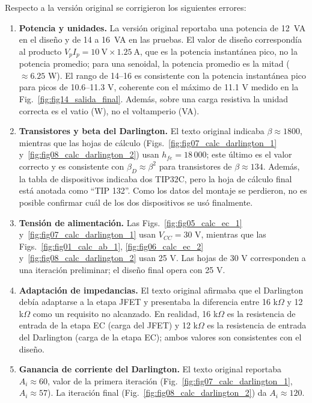 \documentclass[10pt,twocolumn,letterpaper]{article}
\begin{document}
Respecto a la versión original se corrigieron los siguientes errores:
\begin{enumerate}[leftmargin=1.4em]
\item \textbf{Potencia y unidades.} La versión original reportaba una potencia de 12~VA en el diseño y de 14 a 16~VA en las pruebas. El valor de diseño correspondía al producto \(V_p I_p = 10\ \text{V} \times 1.25\ \text{A}\), que es la potencia instantánea pico, no la potencia promedio; para una senoidal, la potencia promedio es la mitad (\(\approx 6.25\) W). El rango de 14--16 es consistente con la potencia instantánea pico para picos de 10.6--11.3 V, coherente con el máximo de 11.1 V medido en la Fig.~\ref{fig:fig14_salida_final}. Además, sobre una carga resistiva la unidad correcta es el vatio (W), no el voltamperio (VA).
\item \textbf{Transistores y beta del Darlington.} El texto original indicaba \(\beta \approx 1800\), mientras que las hojas de cálculo (Figs.~\ref{fig:fig07_calc_darlington_1} y~\ref{fig:fig08_calc_darlington_2}) usan \(h_{fe} = 18\,000\); este último es el valor correcto y es consistente con \(\beta_D \approx \beta^2\) para transistores de \(\beta \approx 134\). Además, la tabla de dispositivos indicaba dos TIP32C, pero la hoja de cálculo final está anotada como ``TIP 132''. Como los datos del montaje se perdieron, no es posible confirmar cuál de los dos dispositivos se usó finalmente.
\item \textbf{Tensión de alimentación.} Las Figs.~\ref{fig:fig05_calc_ec_1} y~\ref{fig:fig07_calc_darlington_1} usan \(V_{CC} = 30\) V, mientras que las Figs.~\ref{fig:fig01_calc_ab_1}, \ref{fig:fig06_calc_ec_2} y~\ref{fig:fig08_calc_darlington_2} usan 25 V. Las hojas de 30 V corresponden a una iteración preliminar; el diseño final opera con 25 V.
\item \textbf{Adaptación de impedancias.} El texto original afirmaba que el Darlington debía adaptarse a la etapa JFET y presentaba la diferencia entre 16 k\(\Omega\) y 12 k\(\Omega\) como un requisito no alcanzado. En realidad, 16 k\(\Omega\) es la resistencia de entrada de la etapa EC (carga del JFET) y 12 k\(\Omega\) es la resistencia de entrada del Darlington (carga de la etapa EC); ambos valores son consistentes con el diseño.
\item \textbf{Ganancia de corriente del Darlington.} El texto original reportaba \(A_i \approx 60\), valor de la primera iteración (Fig.~\ref{fig:fig07_calc_darlington_1}, \(A_i \approx 57\)). La iteración final (Fig.~\ref{fig:fig08_calc_darlington_2}) da \(A_i \approx 120\).

\end{enumerate}
\end{document}
